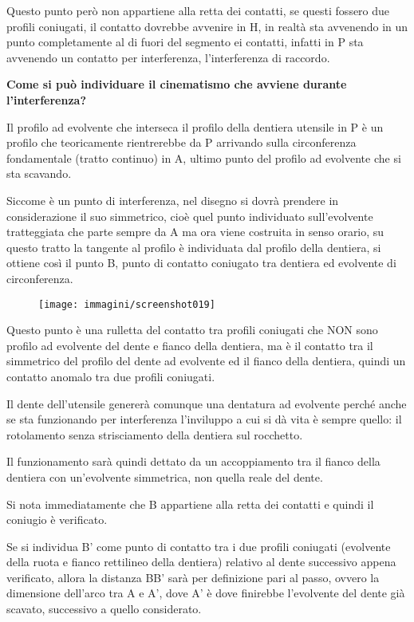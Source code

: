 \documentclass[a4paper, 15pt]{article}
\begin{document}
\begin{adjustwidth}{2in}{}
		Questo punto però non appartiene alla retta dei contatti, se questi  fossero due profili coniugati, il contatto dovrebbe avvenire in H, in realtà sta avvenendo in un punto  completamente al di fuori del segmento ei contatti, infatti in P sta avvenendo un contatto per interferenza, l'interferenza di raccordo. \newline 
		
		\textbf{Come si può individuare il cinematismo che avviene durante l'interferenza?}
		
		Il profilo ad evolvente che interseca il profilo della dentiera utensile in P è un profilo che teoricamente rientrerebbe da P arrivando sulla circonferenza fondamentale (tratto continuo) in A, ultimo punto del profilo ad evolvente che si sta scavando. 
		
		Siccome è un punto di interferenza, nel disegno si dovrà prendere in considerazione il suo simmetrico, cioè quel punto individuato sull'evolvente tratteggiata che parte sempre da A ma ora viene costruita in senso orario, su questo tratto la tangente al profilo è individuata dal profilo della dentiera, si ottiene così il punto B, punto di contatto coniugato tra dentiera ed evolvente di circonferenza.  
		\begin{figure}[H]
	\centering
	\texttt{[image: immagini/screenshot019]}
	\label{fig:screenshot019.1}
\end{figure}		
		Questo punto è una rulletta del contatto tra profili coniugati che NON sono profilo ad evolvente del dente e fianco della dentiera, ma è il contatto tra il simmetrico del profilo del dente ad evolvente ed il fianco della dentiera, quindi un contatto anomalo tra due profili coniugati. 
		
		Il dente dell'utensile genererà comunque una dentatura ad evolvente perché anche se sta funzionando per interferenza l'inviluppo a cui si dà vita è sempre quello: il rotolamento senza strisciamento della dentiera sul rocchetto. 
		
		Il funzionamento sarà quindi dettato da un accoppiamento tra il fianco della dentiera con un'evolvente simmetrica, non quella reale del dente.\newline 
		
		Si nota immediatamente che B appartiene alla retta dei contatti e quindi il coniugio è verificato. 
		
		Se si individua B' come punto di contatto tra i due profili coniugati (evolvente della ruota e fianco rettilineo della dentiera) relativo al dente successivo appena verificato, allora la distanza BB' sarà per definizione pari al passo, ovvero la dimensione dell'arco tra A e A', dove A' è dove finirebbe l'evolvente del dente già scavato, successivo a quello considerato. \newline
		

\end{adjustwidth}
\end{document}
